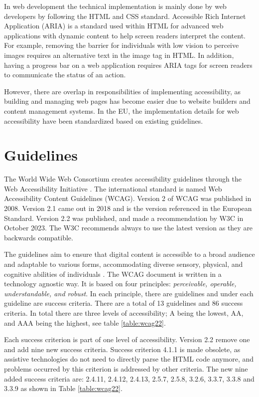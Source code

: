 In web development the technical implementation is mainly done by web developers by following the HTML and CSS standard. Accessible Rich Internet Application (ARIA) is a standard used within HTML for advanced web applications with dynamic content to help screen readers interpret the content. For example, removing the barrier for individuals with low vision to perceive images requires an alternative text in the image tag in HTML. In addition, having a progress bar on a web application requires ARIA tags for screen readers to communicate the status of an action.

However, there are overlap in responsibilities of implementing accessibility, as building and managing web pages has become easier due to website builders and content management systems. In the EU, the implementation details for web accessibility have been standardized based on existing guidelines.

\section{Guidelines}

The World Wide Web Consortium creates accessibility guidelines through the Web Accessibility Initiative \citep{wcagoverview}. The international standard is named Web Accessibility Content Guidelines (WCAG). Version 2 of WCAG was published in 2008. Version 2.1 came out in 2018 and is the version referenced in the European Standard. Version 2.2 was published, and made a recommendation by W3C in October 2023. The W3C recommends always to use the latest version as they are backwards compatible. 

The guidelines aim to ensure that digital content is accessible to a broad audience and adaptable to various forms, accommodating diverse sensory, physical, and cognitive abilities of individuals \citep{wcag22}. The WCAG document is written in a technology agnostic way. It is based on four principles: \textit{perceivable, operable, understandable, and robust}. In each principle, there are guidelines and under each guideline are success criteria. There are a total of 13 guidelines and 86 success criteria. In total there are three levels of accessibility; A being the lowest, AA, and AAA being the highest, see table \ref{table:wcag22}. 

Each success criterion is part of one level of accessibility. Version 2.2 remove one and add nine new success criteria. Success criterion 4.1.1 is made obsolete, as assistive technologies do not need to directly parse the HTML code anymore, and problems occurred by this criterion is addressed by other criteria. The new nine added success criteria are: 2.4.11, 2.4.12, 2.4.13, 2.5.7, 2.5.8, 3.2.6, 3.3.7, 3.3.8 and 3.3.9 as shown in Table \ref{table:wcag22}. 

